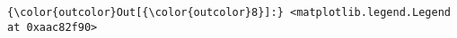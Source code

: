 \documentclass[11pt]{article}
\begin{document}
\begin{Verbatim}[commandchars=\\\{\}]
{\color{outcolor}Out[{\color{outcolor}8}]:} <matplotlib.legend.Legend at 0xaac82f90>
\end{Verbatim}
            
    \begin{center}
    \end{center}
    { \hspace*{\fill} \\}
    

    
    
    
    
\end{document}
